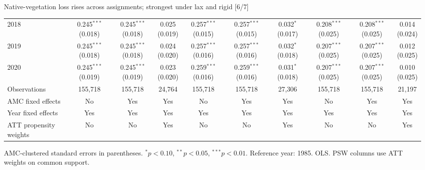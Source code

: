 \documentclass[aspectratio=169]{beamer}
\begin{document}
\begin{frame}{Native-vegetation loss rises across assignments; strongest under lax and rigid [6/7]}
{\begin{tabular}{@{}l*{9}{c}@{}}
2018 & \shortstack{0.245$^{***}$\\(0.018)} & \shortstack{0.245$^{***}$\\(0.018)} & \shortstack{0.025\\(0.019)} & \shortstack{0.257$^{***}$\\(0.015)} & \shortstack{0.257$^{***}$\\(0.015)} & \shortstack{0.032$^{*}$\\(0.017)} & \shortstack{0.208$^{***}$\\(0.025)} & \shortstack{0.208$^{***}$\\(0.025)} & \shortstack{0.014\\(0.024)} \\
2019 & \shortstack{0.245$^{***}$\\(0.018)} & \shortstack{0.245$^{***}$\\(0.018)} & \shortstack{0.024\\(0.020)} & \shortstack{0.257$^{***}$\\(0.016)} & \shortstack{0.257$^{***}$\\(0.016)} & \shortstack{0.032$^{*}$\\(0.018)} & \shortstack{0.207$^{***}$\\(0.025)} & \shortstack{0.207$^{***}$\\(0.025)} & \shortstack{0.012\\(0.025)} \\
2020 & \shortstack{0.245$^{***}$\\(0.019)} & \shortstack{0.245$^{***}$\\(0.019)} & \shortstack{0.023\\(0.020)} & \shortstack{0.259$^{***}$\\(0.016)} & \shortstack{0.259$^{***}$\\(0.016)} & \shortstack{0.031$^{*}$\\(0.018)} & \shortstack{0.207$^{***}$\\(0.025)} & \shortstack{0.207$^{***}$\\(0.025)} & \shortstack{0.010\\(0.025)} \\
\midrule
Observations & 155,718 & 155,718 & 24,764 & 155,718 & 155,718 & 27,306 & 155,718 & 155,718 & 21,197 \\
AMC fixed effects & No & Yes & Yes & No & Yes & Yes & No & Yes & Yes \\
Year fixed effects & Yes & Yes & Yes & Yes & Yes & Yes & Yes & Yes & Yes \\
ATT propensity weights & No & No & Yes & No & No & Yes & No & No & Yes \\
\bottomrule
\end{tabular}%
}
\vspace{0.1em}
{\tiny\color{ZMidGray} AMC-clustered standard errors in parentheses. $^{*}p<0.10$, $^{**}p<0.05$, $^{***}p<0.01$. Reference year: 1985. OLS. PSW columns use ATT weights on common support.}
\end{frame}
\end{document}
